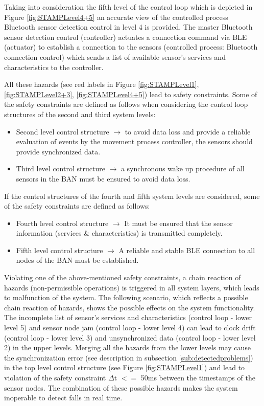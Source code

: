 \documentclass[10pt,journal,compsoc]{IEEEtran}
\begin{document}
	Taking into consideration the fifth level of the control loop which is depicted in Figure \ref{fig:STAMPLevel4+5} an accurate view of the controlled process Bluetooth sensor detection control in level 4 is provided. The master Bluetooth sensor detection control (controller) actuates a connection command via BLE (actuator) to establish a connection to the sensors (controlled process: Bluetooth connection control) which sends a list of available sensor's services and characteristics to the controller. 
	
	All these hazards (see red labels in Figure \ref{fig:STAMPLevel1}, \ref{fig:STAMPLevel2+3}, \ref{fig:STAMPLevel4+5}) lead to safety constraints.
	Some of the safety constraints are defined as follows when considering the control loop structures of the second and third system levels:
	\begin{itemize}
		\item Second level control structure $\rightarrow$ to avoid data loss and provide a reliable evaluation of events by the movement process controller, the sensors should provide synchronized data.
		\item Third level control structure $\rightarrow$ a synchronous wake up procedure of all sensors in the BAN must be ensured to avoid data loss.
	\end{itemize}
	If the control structures of the fourth and fifth system levels are considered, some of the safety constraints are defined as follows:
	\begin{itemize}
		\item Fourth level control structure $\rightarrow$ It must be ensured that the sensor information (services \& characteristics) is transmitted completely.
		\item Fifth level control structure $\rightarrow$ A reliable and stable BLE connection to all nodes of the BAN must be established.
	\end{itemize}
	Violating one of the above-mentioned safety constraints, a chain reaction of hazards (non-permissible operations) is triggered in all system layers, which leads to malfunction of the system.  The following scenario, which reflects a possible chain reaction of hazards, shows the possible effects on the system functionality.
	The incomplete list of sensor's services and characteristics (control loop - lower level 5) and sensor node jam (control loop - lower level 4) can lead to clock drift (control loop - lower level 3) and unsynchronized data (control loop - lower level 2) in the upper levels. Merging all the hazards from the lower levels may cause the synchronization error (see description in subsection \ref{sub:detectedproblems}) in the top level control structure (see Figure \ref{fig:STAMPLevel1}) and lead to violation of the safety constraint $\Delta$t $<=$ 50ms between the timestamps of the sensor nodes. The combination of these possible hazards makes the system inoperable to detect falls in real time.
	
\end{document}
